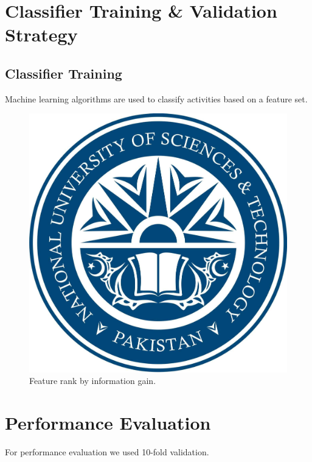 \documentclass[12pt,a4paper,oneside]{book}
\begin{document}
\section{Classifier Training \& Validation Strategy}
\label{subsec:Classifier_Training_and_Validation_Strategy}

\subsection{Classifier Training}
\label{subsec:Classifier_Training}
%
Machine learning algorithms are used to classify activities based on a feature set.


\begin{figure}[htp]
\centering
\includegraphics[width=0.9\columnwidth]{nust}%
\caption{Feature rank by information gain.}
\label{fig:Feature_Rank}
\end{figure}


\section{Performance Evaluation}
\label{sec:Performance_Evaluation}
%
For performance evaluation we used 10-fold validation.
\end{document}

